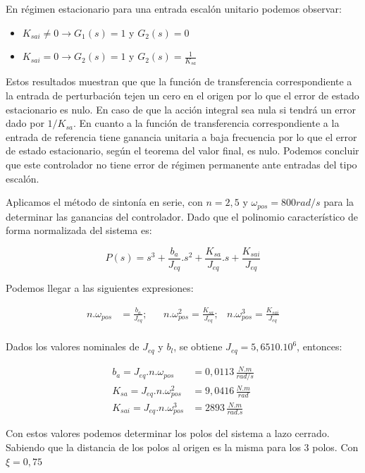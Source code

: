 \documentclass{article}
\begin{document}
En régimen estacionario para una entrada escalón unitario podemos observar:

\begin{itemize}
    \item $K_{sai} \neq 0 \to G_1(s) = 1 $ y $G_2(s) = 0$
    \item $K_{sai} = 0 \to G_2(s) = 1 $ y $G_2(s) = \frac{1}{K_{sa}} $
\end{itemize}

Estos resultados muestran que que la función de transferencia
correspondiente a la entrada de perturbación tejen un cero en el origen por lo que el error de estado 
estacionario es nulo. En caso de que la acción integral sea nula si tendrá un error dado por $1/K_{sa}$.
En cuanto a la función de transferencia correspondiente a la entrada de referencia tiene ganancia
unitaria a baja frecuencia por lo que el error de estado estacionario, según el teorema del valor final, 
es nulo. Podemos concluir que este  controlador no tiene error de régimen permanente ante entradas del tipo escalón.

Aplicamos el método de sintonía en serie, con $n = 2,5$ y $\omega_{pos} = 800 rad/s$
para la determinar las ganancias del controlador. Dado que el polinomio 
característico de forma normalizada del sistema es:

\begin{equation}
    P(s) = s^3 + \frac{b_a}{J_{eq}}.s^2 + \frac{K_{sa}}{J_{eq}}.s + \frac{K_{sai}}{J_{eq}}
\end{equation}

Podemos llegar a las siguientes expresiones:

\begin{align*}
    n.\omega_{pos} &= \frac{b_a}{J_{eq}}; & &n.\omega_{pos}^2 = \frac{K_{sa}}{J_{eq}}; & n.\omega_{pos}^3 = \frac{K_{sai}}{J_{eq}} \\
\end{align*}

Dados los valores nominales de $J_{eq}$ y $b_l$, se obtiene $J_{eq} = 5,6510.10^6$, entonces:

\begin{align*}
    b_a = J_{eq}.n.\omega_{pos} &= 0,0113\, \frac{N.m}{rad/s} \\ 
    K_{sa} = J_{eq}.n.\omega_{pos}^2 &= 9,0416\, \frac{N.m}{rad} \\
    K_{sai} = J_{eq}.n.\omega_{pos}^3 &= 2893\, \frac{N.m}{rad.s}
\end{align*}

Con estos valores podemos determinar los polos del sistema a lazo cerrado. Sabiendo que la distancia
de los polos al origen es la misma para los 3 polos. Con $\xi = 0,75$
\end{document}
